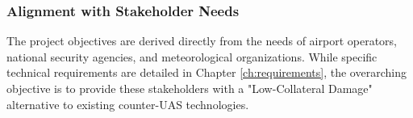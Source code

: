 \subsubsection{Alignment with Stakeholder Needs}
The project objectives are derived directly from the needs of airport operators, national security agencies, and meteorological organizations. While specific technical requirements are detailed in Chapter \ref{ch:requirements}, the overarching objective is to provide these stakeholders with a "Low-Collateral Damage" alternative to existing counter-UAS technologies.